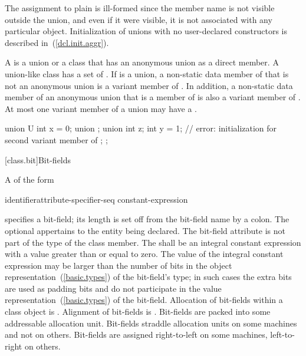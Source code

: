 The assignment to plain  is ill-formed since the member name
is not visible outside the union, and even if it were visible, it is not
associated with any particular object.
\exitexample
\enternote
Initialization of unions with no user-declared constructors is described
in~(\ref{dcl.init.aggr}).
\exitnote

\pnum
A  is a union or a class that has an anonymous union as a direct
member. A union-like class  has a set of .
If  is a union, a non-static data member of  that is not an anonymous
union is a variant member of . In addition, a non-static data member of an
anonymous union that is a member of  is also a variant member of .
At most one variant member of a union may have a .
\enterexample

\begin{codeblock}
union U {
  int x = 0;
  union { };
  union {
    int z;
    int y = 1; // error: initialization for second variant member of 
  };
};
\end{codeblock}

\exitexample

[class.bit]{Bit-fields}%

\pnum
A  of the form

\begin{ncbnftab}
identifier\opt  attribute-specifier-seq\opt \terminal{:} constant-expression
\end{ncbnftab}

%
%
specifies a bit-field;
its length is set off from the bit-field name by a colon. The optional  appertains to the entity being declared. The bit-field
attribute is not part of the type of the class member. The
 shall be an integral constant expression
with a value greater than or equal to zero. The
value of the integral constant expression may
be larger than the number of bits in the object
representation~(\ref{basic.types}) of the bit-field's type; in such
cases the extra bits are used as padding bits and do not participate in
the value representation~(\ref{basic.types}) of the bit-field.
%
Allocation of bit-fields within a class object is
.
%
Alignment of bit-fields is .
%
Bit-fields are packed into some addressable allocation unit.
\enternote
Bit-fields straddle allocation units on some machines and not on others.
Bit-fields are assigned right-to-left on some machines, left-to-right on
others.
\exitnote

